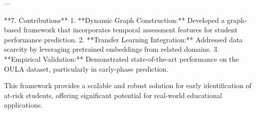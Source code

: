 ---

**7. Contributions**  
1. **Dynamic Graph Construction:** Developed a graph-based framework that incorporates temporal assessment features for student performance prediction.  
2. **Transfer Learning Integration:** Addressed data scarcity by leveraging pretrained embeddings from related domains.  
3. **Empirical Validation:** Demonstrated state-of-the-art performance on the OULA dataset, particularly in early-phase prediction.  

This framework provides a scalable and robust solution for early identification of at-risk students, offering significant potential for real-world educational applications.